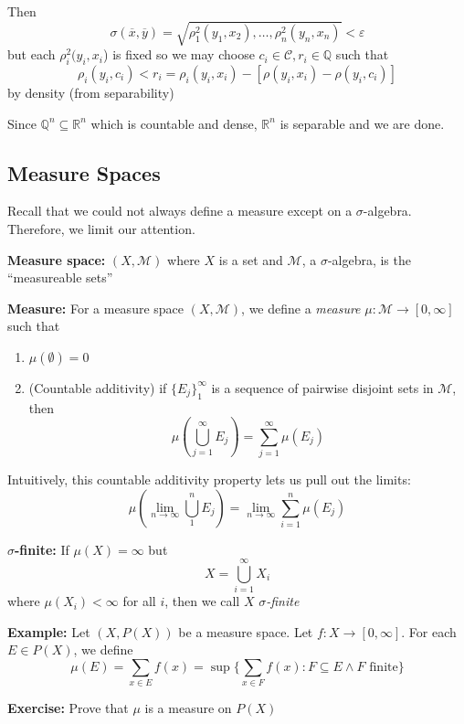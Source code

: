 \documentclass[12pt]{report}
\newcommand{\R}{\mathbb{R}}
\newcommand{\Q}{\mathbb{Q}}
\newcommand{\ep}{\varepsilon}
\newcommand{\M}{\mathcal{M}}
\newcommand{\sub}{\subseteq}
\renewcommand{\bar}[1]{\overline{#1}}
\newenvironment*{tbox}[2][gray]{
    \begin{tcolorbox}[
        parbox=false,
        colback=#1!5!white,
        colframe=#1!75!black,
        breakable,
        title={#2}
    ]}
    {\end{tcolorbox}}
\newenvironment*{exercise}[1][red]{
    \begin{tcolorbox}[
        parbox=false,
        colback=#1!5!white,
        colframe=#1!75!black,
        breakable
    ]}
    {\end{tcolorbox}}
\newenvironment*{proof}[1][blue]{
\begin{tcolorbox}[
    parbox=false,
    colback=#1!5!white,
    colframe=#1!75!black,
    breakable
]}
{\end{tcolorbox}}
\begin{document}
\begin{tbox}{\textbf{Proposition:} $B_{\R^n}$ is  }
\begin{proof}
            Then 
            \[\sigma(\bar x, \bar y) = \sqrt{\rho_1^2(y_1, x_2), \dots, \rho_n^2(y_n, x_n)} < \ep\]
            but each $\rho_i^2(y_i, x_i$) is fixed so we may choose $c_i \in \mathcal C, r_i \in \Q$ such that 
            \[\rho_i(y_i, c_i) < r_i = \rho_i(y_i, x_i) - [\rho(y_i, x_i) - \rho(y_i, c_i)]\]
            by density (from separability) 


        \end{proof}

        Since $\Q^n \sub \R^n$ which is countable and dense, $\R^n$ is separable and we are done. 
    \end{tbox}

    \subsection*{Measure Spaces}
        Recall that we could not always define a measure except on a $\sigma$-algebra. Therefore, we limit our attention.

        \textbf{Measure space:} $(X, \M)$ where $X$ is a set and $\M$, a $\sigma$-algebra, is the ``measureable sets''

        \textbf{Measure:} For a measure space $(X, \M)$, we define a \emph{measure} $\mu: \M \to [0, \infty]$ such that 
        \begin{enumerate}
            \item $\mu(\emptyset) = 0$
            \item (Countable additivity) if $\{E_j\}_1^{\infty}$ is a sequence of pairwise disjoint sets in $\M$, then 
            \[\mu\left(\bigcup_{j=1}^{\infty} E_j\right) = \sum_{j=1}^{\infty} \mu(E_j)\] 
        \end{enumerate}

        Intuitively, this countable additivity property lets us pull out the limits:
        \[\mu\left(\lim_{n \to \infty} \bigcup_{1}^n E_j\right) = \lim_{n\to \infty} \sum_{i=1}^n \mu(E_j)\] 

        \textbf{$\sigma$-finite:} If $\mu(X) = \infty$ but 
        \[X = \bigcup_{i=1}^{\infty} X_i\]
        where $\mu(X_i) < \infty$ for all $i$, then we call $X$ \emph{$\sigma$-finite}

        \textbf{Example:} Let $(X, P(X))$ be a measure space. Let $f: X \to [0, \infty]$. For each $E \in P(X)$, we define 
        \[\mu(E) = \sum_{x \in E} f(x) = \sup\{\sum_{x \in F} f(x): F \sub E \land F \text{ finite}\}\] 

        \begin{exercise}
            \textbf{Exercise:} Prove that $\mu$ is a measure on $P(X)$
        \end{exercise}
\end{document}
